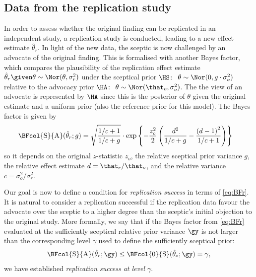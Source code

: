 \subsection{Data from the replication study}
\label{sec:bfr}
In order to assess whether the original finding can be replicated in an
independent study, a replication study is conducted, leading to a new effect
estimate $\hat{\theta}_r$. In light of the new data, the sceptic is now
challenged by an advocate of the original finding. This is formalised with
another Bayes factor, which compares the plausibility of the replication effect
estimate $\hat{\theta}_r \given \theta \sim \Nor(\theta, \sigma^2_r)$ under the
sceptical prior $\HS \colon$ $\theta \sim \Nor(0, g \cdot \sigma^2_o)$ relative
to the advocacy prior $\HA \colon$ $\theta \sim \Nor(\that_o, \sigma^2_o)$. The
the view of an advocate is represented by $\HA$ since this is the posterior of
$\theta$ given the original estimate and a uniform prior (also the reference
prior for this model). The Bayes factor is given by
\begin{align}
  \label{eq:BFr}
  \BFcol{\mathrm{S}}{\mathrm{A}}(\hat{\theta}_r; g)
  &= \sqrt{\frac{1/c + 1}{1/c + g}} \cdot
  \exp\left\{-\frac{z_o^2}{2}\left(\frac{d^2}{1/c + g} -
  \frac{\left(d - 1\right)^2}{1/c + 1} \right)\right\}
\end{align}
so it depends on the original $z$-statistic $z_o$, the relative sceptical prior
variance $g$, the relative effect estimate $d = \that_r/\that_o$, and the
relative variance $c = \sigma^2_o/\sigma^2_r$.

Our goal is now to define a condition for \emph{replication success} in terms of
\eqref{eq:BFr}. It is natural to consider a replication successful if the
replication data favour the advocate over the sceptic to a higher degree than
the sceptic's initial objection to the original study. More formally, we say
that if the Bayes factor from \eqref{eq:BFr} evaluated at the sufficiently
sceptical relative prior variance $\gy$ is not larger than the corresponding
level $\gamma$ used to define the sufficiently sceptical prior:
\begin{align}
  \label{eq:success}
  \BFcol{\mathrm{S}}{\mathrm{A}}(\hat{\theta}_r; \gy)
  \leq \BFcol{0}{\mathrm{S}}(\hat{\theta}_o; \gy) =\gamma,
\end{align}
we have established \emph{replication success at level $\gamma$}.


